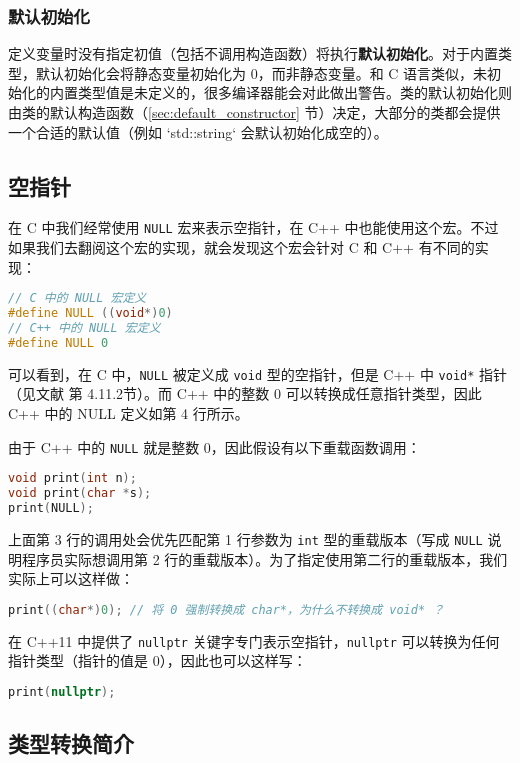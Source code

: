 \documentclass[hyperref,UTF8]{article}
\begin{document}
\subsubsection{默认初始化} \label{sec:default_init}

定义变量时没有指定初值（包括不调用构造函数）将执行\textbf{默认初始化}。对于内置类型，默认初始化会将静态变量初始化为 0，而非静态变量。和 C 语言类似，未初始化的内置类型值是未定义的，很多编译器能会对此做出警告。类的默认初始化则由类的默认构造函数（\ref{sec:default_constructor} 节）决定，大部分的类都会提供一个合适的默认值（例如 `std::string` 会默认初始化成空的）。

\subsection{空指针}

在 C 中我们经常使用 \texttt{NULL} 宏来表示空指针，在 C++ 中也能使用这个宏。不过如果我们去翻阅这个宏的实现，就会发现这个宏会针对 C 和 C++ 有不同的实现：
\begin{lstlisting}[language=c++]
// C 中的 NULL 宏定义
#define NULL ((void*)0)
// C++ 中的 NULL 宏定义
#define NULL 0
\end{lstlisting}
可以看到，在 C 中，\texttt{NULL} 被定义成 \texttt{void} 型的空指针，但是 C++ 中 \texttt{void*} 指针（见文献 \cite{Lippman2013C} 第 4.11.2节）。而 C++ 中的整数 0 可以转换成任意指针类型，因此 C++ 中的 NULL 定义如第 4 行所示。

由于 C++ 中的 \texttt{NULL} 就是整数 0，因此假设有以下重载函数调用：
\begin{lstlisting}[language=c++]
void print(int n);
void print(char *s);
print(NULL);
\end{lstlisting}
上面第 3 行的调用处会优先匹配第 1 行参数为 \texttt{int} 型的重载版本（写成 \texttt{NULL} 说明程序员实际想调用第 2 行的重载版本）。为了指定使用第二行的重载版本，我们实际上可以这样做：
\begin{lstlisting}[language=c++,numbers=none]
print((char*)0); // 将 0 强制转换成 char*，为什么不转换成 void* ？
\end{lstlisting}
在 C++11 中提供了 \texttt{nullptr} 关键字专门表示空指针，\texttt{nullptr} 可以转换为任何指针类型（指针的值是 0），因此也可以这样写：
\begin{lstlisting}[language=c++,numbers=none,style=c++11]
print(nullptr);
\end{lstlisting}

\subsection{类型转换简介}
\end{document}
